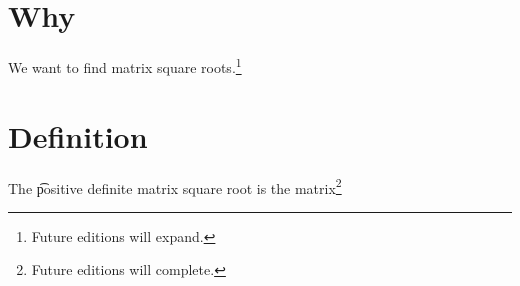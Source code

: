 

\section*{Why}

We want to find matrix square roots.\footnote{Future editions will expand.}

\section*{Definition}

The \t{positive definite matrix square root} is the matrix\footnote{Future editions will complete.}

\blankpage